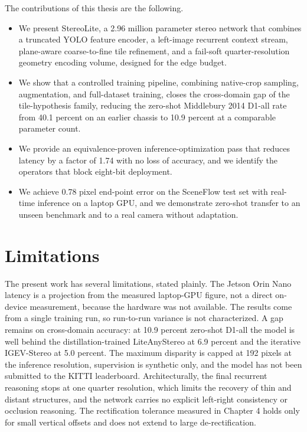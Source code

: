 The contributions of this thesis are the following.
\begin{itemize}
\item We present StereoLite, a 2.96 million parameter stereo network that
combines a truncated YOLO feature encoder, a left-image recurrent context
stream, plane-aware coarse-to-fine tile refinement, and a fail-soft
quarter-resolution geometry encoding volume, designed for the edge budget.
\item We show that a controlled training pipeline, combining native-crop
sampling, augmentation, and full-dataset training, closes the cross-domain
gap of the tile-hypothesis family, reducing the zero-shot Middlebury 2014
D1-all rate from 40.1 percent on an earlier chassis to 10.9 percent at a
comparable parameter count.
\item We provide an equivalence-proven inference-optimization pass that
reduces latency by a factor of 1.74 with no loss of accuracy, and we
identify the operators that block eight-bit deployment.
\item We achieve 0.78 pixel end-point error on the SceneFlow test set with
real-time inference on a laptop GPU, and we demonstrate zero-shot transfer
to an unseen benchmark and to a real camera without adaptation.
\end{itemize}

\section{Limitations}
The present work has several limitations, stated plainly. The Jetson Orin
Nano latency is a projection from the measured laptop-GPU figure, not a
direct on-device measurement, because the hardware was not available. The
results come from a single training run, so run-to-run variance is not
characterized. A gap remains on cross-domain accuracy: at 10.9 percent
zero-shot D1-all the model is well behind the distillation-trained
LiteAnyStereo at 6.9 percent and the iterative IGEV-Stereo at 5.0 percent.
The maximum disparity is capped at 192 pixels at the inference resolution,
supervision is synthetic only, and the model has not been submitted to the
KITTI leaderboard. Architecturally, the final recurrent reasoning stops at
one quarter resolution, which limits the recovery of thin and distant
structures, and the network carries no explicit left-right consistency or
occlusion reasoning. The rectification tolerance measured in Chapter 4
holds only for small vertical offsets and does not extend to large
de-rectification.

